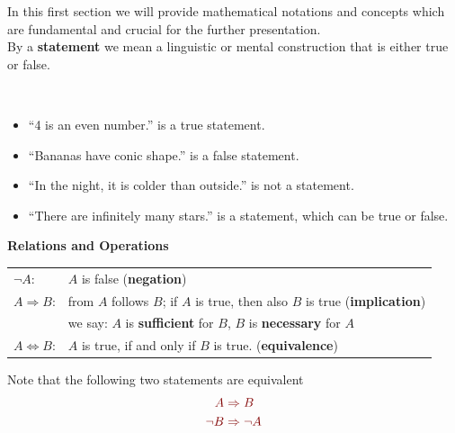
\begin{frame}
	In this first section we will provide mathematical notations and concepts which are fundamental and crucial for the further presentation.\\
	\vspace{0.2cm}
		\vspace{0.2cm}
	By a \textbf{statement} we mean a linguistic or mental construction that is either true or false.
	\vspace{0.2cm}
	\begin{ex}~\\\vspace{0.1cm}
		\begin{itemize}
		\item ``4 is an even number.'' is a true statement.
		\item ``Bananas have conic shape.'' is a false statement.
		\item ``In the night, it is colder than outside.'' is not a statement.
		\item ``There are infinitely many stars.'' is a statement, which can be true or false.
		\end{itemize}
	\end{ex}
	\vspace{0.2cm}
	\textbf{Relations and Operations}
	\color{defgruen}
	\begin{center} \vspace{-0.1cm}
		\begin{tabular}[t]{ll}
			$\neg A$: & $A$ is false (\textbf{negation})\\\vspace{0.2cm}
			$A\Rightarrow B$: & from $A$ follows $B$; if $A$ is true, then also $B$ is true (\textbf{implication})\\\vspace{0.2cm}
			& we say: $A$ is \textbf{sufficient} for $B$, $B$ is \textbf{necessary} for $A$\\\vspace{0.2cm}
			$A\Leftrightarrow B$: & $A$ is true, if and only if  $B$ is true. (\textbf{equivalence})
		\end{tabular}
	\end{center}
\color{fontcolor}
	Note that the following two statements are equivalent
	\begin{align*}
	\color{satzrot}A&\color{satzrot}\Rightarrow B\\
	\color{satzrot}\neg B&\color{satzrot} \Rightarrow \neg A 
	\end{align*}
\end{frame}

